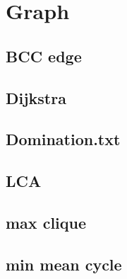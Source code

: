 \section{Graph}
		
	\subsection{BCC edge}
		
	\subsection{Dijkstra}
		
%		
	\subsection{Domination.txt}
		
%		
%		
	\subsection{LCA}
		
	\subsection{max clique}
		
	\subsection{min mean cycle}
		
%		
%		
